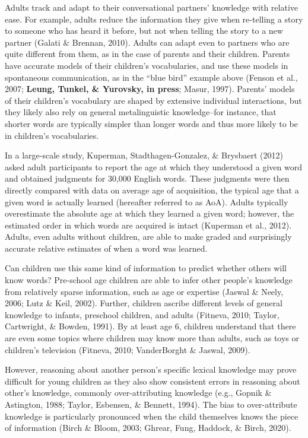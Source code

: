 \documentclass[10pt, letterpaper]{article}
\begin{document}
Adults track and adapt to their conversational partners' knowledge with
relative ease. For example, adults reduce the information they give when
re-telling a story to someone who has heard it before, but not when
telling the story to a new partner (Galati \& Brennan, 2010). Adults can
adapt even to partners who are quite different from them, as in the case
of parents and their children. Parents have accurate models of their
children's vocabularies, and use these models in spontaneous
communication, as in the ``blue bird'' example above (Fenson et al.,
2007; \textbf{Leung, Tunkel, \& Yurovsky, in press}; Masur, 1997).
Parents' models of their children's vocabulary are shaped by extensive
individual interactions, but they likely also rely on general
metalinguistic knowledge--for instance, that shorter words are typically
simpler than longer words and thus more likely to be in children's
vocabularies.

In a large-scale study, Kuperman, Stadthagen-Gonzalez, \& Brysbaert
(2012) asked adult participants to report the age at which they
understood a given word and obtained judgments for 30,000 English words.
These judgments were then directly compared with data on average age of
acquisition, the typical age that a given word is actually learned
(hereafter referred to as AoA). Adults typically overestimate the
absolute age at which they learned a given word; however, the estimated
order in which words are acquired is intact (Kuperman et al., 2012).
Adults, even adults without children, are able to make graded and
surprisingly accurate relative estimates of when a word was learned.

Can children use this same kind of information to predict whether others
will know words? Pre-school age children are able to infer other
people's knowledge from relatively sparse information, such as age or
expertise (Jaswal \& Neely, 2006; Lutz \& Keil, 2002). Further, children
ascribe different levels of general knowledge to infants, preschool
children, and adults (Fitneva, 2010; Taylor, Cartwright, \& Bowden,
1991). By at least age 6, children understand that there are even some
topics where children may know more than adults, such as toys or
children's television (Fitneva, 2010; VanderBorght \& Jaswal, 2009).

However, reasoning about another person's specific lexical knowledge may
prove difficult for young children as they also show consistent errors
in reasoning about other's knowledge, commonly over-attributing
knowledge (e.g., Gopnik \& Astington, 1988; Taylor, Esbensen, \&
Bennett, 1994). The bias to over-attribute knowledge is particularly
pronounced when the child themselves knows the piece of information
(Birch \& Bloom, 2003; Ghrear, Fung, Haddock, \& Birch, 2020).
\end{document}
